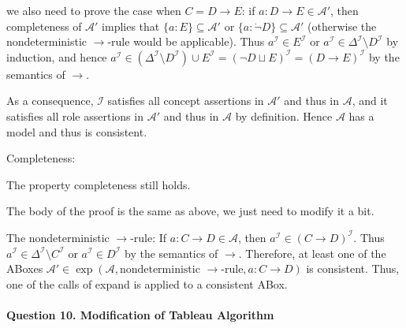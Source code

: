 \documentclass[12pt]{article}
\begin{document}
\begin{enumerate}
we also need to prove the case when $C=D\rightarrow E$: if $a: D \to E \in \mathcal{A}'$, then completeness of $\mathcal{A}'$ implies that $\{ a: E \} \subseteq \mathcal{A}'$ or $\{ a: \dot{\lnot} D \} \subseteq \mathcal{A}'$ (otherwise the nondeterministic $\to$-rule would be applicable). Thus $a^{\mathcal{I}} \in E^{\mathcal{I}}$ or $a^{\mathcal{I}} \in \Delta^{\mathcal{I}} \setminus D^{\mathcal{I}}$ by induction, and hence $a^{\mathcal{I}} \in (\Delta^{\mathcal{I}} \setminus D^{\mathcal{I}}) \cup E^{\mathcal{I}} = (\lnot D \sqcup E)^{\mathcal{I}} = (D \to E)^{\mathcal{I}}$ by the semantics of $\to$.\par
As a consequence, $\mathcal{I}$ satisfies all concept assertions in $\mathcal{A}'$ and thus in $\mathcal{A}$, and it satisfies all role assertions in $\mathcal{A}'$ and thus in $\mathcal{A}$ by definition. Hence $\mathcal{A}$ has a model and thus is consistent.\par
Completeness:\par
The property completeness still holds. \par
The body of the proof is the same as above, we just need to modify it a bit.\par
The nondeterministic $\to$-rule: If $a: C \to D \in \mathcal{A}$, then $a^{\mathcal{I}} \in (C \to D)^{\mathcal{I}}$. Thus $a^{\mathcal{I}} \in \Delta^{\mathcal{I}} \setminus C^{\mathcal{I}}$ or $a^{\mathcal{I}} \in D^{\mathcal{I}}$ by the semantics of $\to$. Therefore, at least one of the ABoxes $\mathcal{A}' \in \exp (\mathcal{A}, \text{nondeterministic } \to \text{-rule}, a: C \to D)$ is consistent. Thus, one of the calls of expand is applied to a consistent ABox.\par
\end{enumerate}
    
    \paragraph{Question 10. Modification of Tableau Algorithm}~{}
    \\
    
\end{document}
